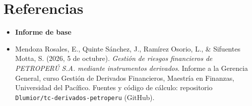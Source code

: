 \chapter{Referencias}

\begin{itemize}[leftmargin=1em,itemsep=4pt]
\raggedright
\item[] \textbf{Informe de base}
\item Mendoza Rosales, E., Quinte Sánchez, J., Ramírez Osorio, L., \& Sifuentes Motta, S. (2026, 5 de octubre). \emph{Gestión de riesgos financieros de PETROPERÚ S.A. mediante instrumentos derivados}. Informe a la Gerencia General, curso Gestión de Derivados Financieros, Maestría en Finanzas, Universidad del Pacífico. Fuentes y código de cálculo: repositorio \texttt{Dlumior/tc-derivados-petroperu} (GitHub).


\end{itemize}
